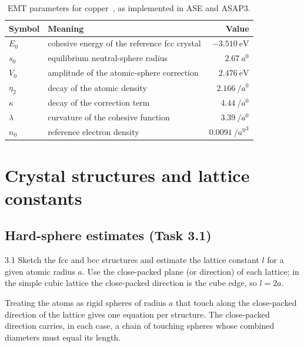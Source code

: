\documentclass[11pt,a4paper]{article}
\numberwithin{equation}{section}
\theoremstyle{remark}
\begin{document}
\begin{table}[ht]
  \centering
  \caption{EMT parameters for copper~\citep{jacobsen1996}, as implemented in ASE and ASAP3.}
  \label{tab:emtparams}
  \begin{tabular}{llr}
    \toprule
    Symbol & Meaning & Value \\
    \midrule
    $E_0$      & cohesive energy of the reference fcc crystal & $\SI{-3.510}{\electronvolt}$ \\
    $s_0$      & equilibrium neutral-sphere radius            & $\SI{2.67}{\bohr}$ \\
    $V_0$      & amplitude of the atomic-sphere correction    & $\SI{2.476}{\electronvolt}$ \\
    $\eta_2$   & decay of the atomic density                  & $\SI{2.166}{\per\bohr}$ \\
    $\kappa$   & decay of the correction term                 & $\SI{4.44}{\per\bohr}$ \\
    $\lambda$  & curvature of the cohesive function           & $\SI{3.39}{\per\bohr}$ \\
    $n_0$      & reference electron density                   & $\SI{0.0091}{\per\bohr\cubed}$ \\
    \bottomrule
  \end{tabular}
\end{table}

\section{Crystal structures and lattice constants}\label{sec:lattice}

\subsection{Hard-sphere estimates (Task 3.1)}\label{sec:hardsphere}

\begin{task}{3.1}
  Sketch the fcc and bcc structures and estimate the lattice constant $l$ for a given atomic radius
  $a$. Use the close-packed plane (or direction) of each lattice; in the simple cubic lattice the
  close-packed direction is the cube edge, so $l = 2a$.
\end{task}

Treating the atoms as rigid spheres of radius $a$ that touch along the close-packed direction of the
lattice gives one equation per structure. The close-packed direction carries, in each case, a chain of
touching spheres whose combined diameters must equal its length.
\end{document}

